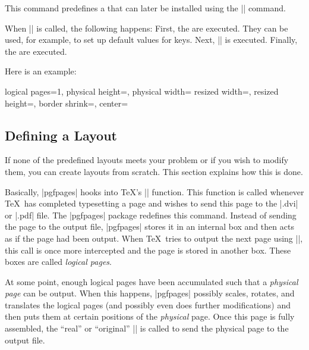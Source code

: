 \begin{command}{\pgfpagesdeclarelayout{}}
  This command predefines a  that can later be installed
  using the |\pgfpagesuselayout| command.

  When |\pgfpagesuselayout| is called, the
  following happens: First, the  are
  executed. They can be used, for example, to set up default values for
  keys. Next, || is
  executed. Finally, the  are executed.

  Here is an example:
\begin{codeexample}
{
  \def\pgfpageoptionborder{0pt}
}
{
  \pgfpagesphysicalpageoptions
  {%
    logical pages=1,%
    physical height=\pgfpageoptionheight,%
    physical width=\pgfpageoptionwidth%
  }
  {%
    resized width=\pgfphysicalwidth,%
    resized height=\pgfphysicalheight,%
    border shrink=\pgfpageoptionborder,%
    center=\pgfpoint{.5\pgfphysicalwidth}{.5\pgfphysicalheight}%
  }%
}
\end{codeexample}
\end{command}




\subsection{Defining a Layout}

If none of the predefined layouts meets your problem or if you wish to
modify them, you can create layouts from scratch. This section
explains how this is done.

Basically, |pgfpages| hooks into \TeX's |\shipout| function. This
function is called whenever \TeX\ has completed typesetting a page and
wishes to send this page to the |.dvi| or |.pdf| file. The |pgfpages|
package redefines this command. Instead of sending the page to the output
file, |pgfpages| stores it in an internal box and then acts as if the
page had been output. When \TeX\ tries to output the next page using
|\shipout|, this call is once more intercepted and the page is stored
in another box. These boxes are called \emph{logical pages}.

At some point, enough logical pages have been accumulated such that a
\emph{physical page} can be output. When this happens, |pgfpages|
possibly scales, rotates, and translates the logical pages (and
possibly even does further modifications) and then puts them at
certain positions of the \emph{physical} page. Once this page is fully
assembled, the ``real'' or ``original'' |\shipout| is called to
send the physical page to the output file.

